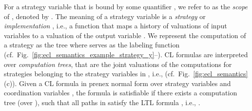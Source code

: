 \documentclass{LMCS}
\theoremstyle{plain}\newtheorem{theorem}[thm]{Theorem}
\theoremstyle{plain}\newtheorem{lemma}[thm]{Lemma}
\theoremstyle{plain}\newtheorem{proposition}[thm]{Proposition}
\theoremstyle{plain}\newtheorem{corollary}[thm]{Corollary}
\theoremstyle{definition}\newtheorem{definition}{Definition}[section]
\begin{document}
For a strategy variable  that is bound by some quantifier , we refer to  as the \emph{scope} of , denoted by .
The meaning of a strategy variable  is a \emph{strategy} or \emph{implementation} , i.e., a function that maps a history of valuations of input variables to a valuation of the output variable .
We represent the computation of a strategy  as the tree  where  serves as the labeling function (cf.~Fig.~\ref{fig:ecl_semantics_example_strategy_y}--).
CL formulas are interpreted over \emph{computation trees}, that are the joint valuations of the computations for strategies belonging to the strategy variables in , i.e.,  (cf.~Fig.~\ref{fig:ecl_semantics}(c)).
Given a CL formula  in prenex normal form over strategy variables  and coordination variables , the formula is satisfiable if there exists a computation tree  (over ), such that all paths in  satisfy the LTL formula , i.e., .
\end{document}
